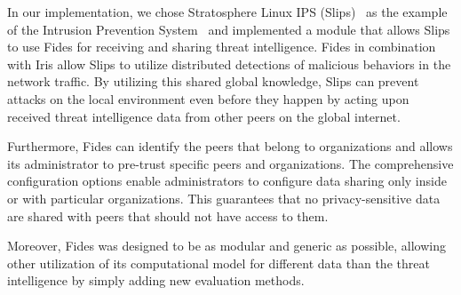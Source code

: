 In our implementation, we chose Stratosphere Linux IPS (Slips)~\cite{slips} as the example of the Intrusion Prevention System~\cite{zhang2004intrusion} and implemented a module that allows Slips to use Fides for receiving and sharing threat intelligence. Fides in combination with Iris allow Slips to utilize distributed detections of malicious behaviors in the network traffic.
By utilizing this shared global knowledge, Slips can prevent attacks on the local environment even before they happen by acting upon received threat intelligence data from other peers on the global internet.

Furthermore, Fides can identify the peers that belong to organizations and allows its administrator to pre-trust specific peers and organizations. The comprehensive configuration options enable administrators to configure data sharing only inside or with particular organizations. This guarantees that no privacy-sensitive data are shared with peers that should not have access to them.

Moreover, Fides was designed to be as modular and generic as possible, allowing other utilization of its computational model for different data than the threat intelligence by simply adding new evaluation methods.




